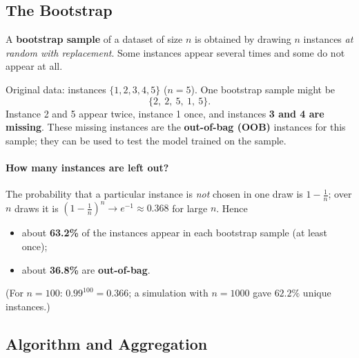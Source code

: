 \subsection{The Bootstrap}

\begin{definition}
A \textbf{bootstrap sample} of a dataset of size $n$ is obtained by drawing $n$ instances \emph{at random with replacement}. Some instances appear several times and some do not appear at all.
\end{definition}

\begin{example}
Original data: instances $\{1,2,3,4,5\}$ ($n=5$). One bootstrap sample might be
\[
  \{2,\ 2,\ 5,\ 1,\ 5\}.
\]
Instance 2 and 5 appear twice, instance 1 once, and instances \textbf{3 and 4 are missing}. These missing instances are the \textbf{out-of-bag (OOB)} instances for this sample; they can be used to test the model trained on the sample.
\end{example}

\paragraph{How many instances are left out?} The probability that a particular instance is \emph{not} chosen in one draw is $1-\frac1n$; over $n$ draws it is $(1-\frac1n)^n\to e^{-1}\approx0.368$ for large $n$. Hence

\begin{itemize}
  \item about \textbf{63.2\%} of the instances appear in each bootstrap sample (at least once);
  \item about \textbf{36.8\%} are \textbf{out-of-bag}.
\end{itemize}

(For $n=100$: $0.99^{100}=0.366$; a simulation with $n=1000$ gave $62.2\%$ unique instances.)

\subsection{Algorithm and Aggregation}


